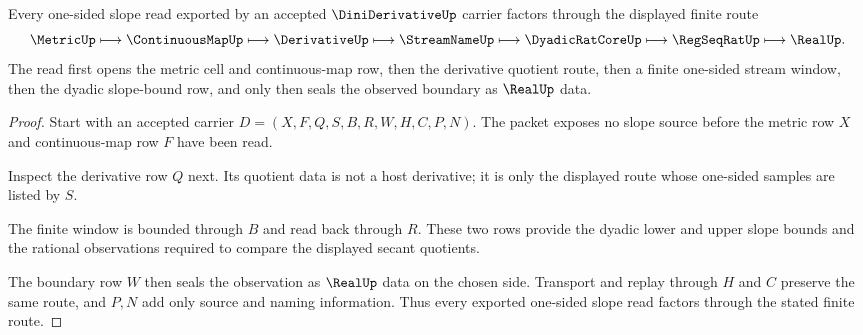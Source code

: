 \begin{theorem}
\label{thm:dini-derivative-finite-slope-window}
Every one-sided slope read exported by an accepted $\DiniDerivativeUp$ carrier factors through the displayed finite route
$$
\MetricUp \longmapsto \ContinuousMapUp \longmapsto \DerivativeUp \longmapsto \StreamNameUp \longmapsto \DyadicRatCoreUp \longmapsto \RegSeqRatUp \longmapsto \RealUp.
$$
The read first opens the metric cell and continuous-map row, then the derivative quotient route, then a finite one-sided stream window, then the dyadic slope-bound row, and only then seals the observed boundary as $\RealUp$ data.
\end{theorem}
\begin{proof}
Start with an accepted carrier $D=(X,F,Q,S,B,R,W,H,C,P,N)$. The packet exposes no slope source before the metric row $X$ and continuous-map row $F$ have been read.

Inspect the derivative row $Q$ next. Its quotient data is not a host derivative; it is only the displayed route whose one-sided samples are listed by $S$.

The finite window is bounded through $B$ and read back through $R$. These two rows provide the dyadic lower and upper slope bounds and the rational observations required to compare the displayed secant quotients.

The boundary row $W$ then seals the observation as $\RealUp$ data on the chosen side. Transport and replay through $H$ and $C$ preserve the same route, and $P,N$ add only source and naming information. Thus every exported one-sided slope read factors through the stated finite route.
\end{proof}

